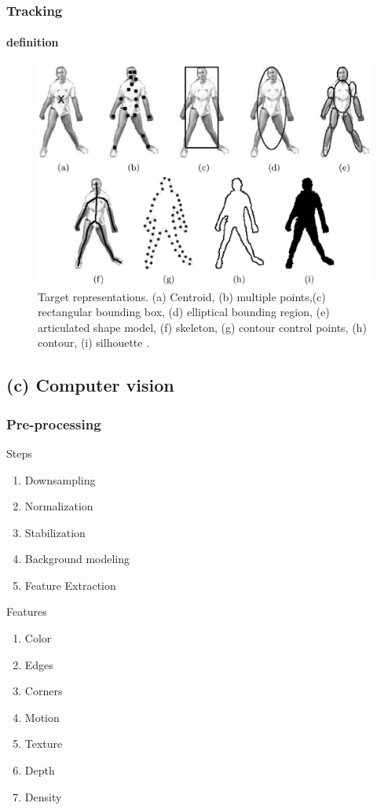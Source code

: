 \begin{frame}
\frametitle{Tracking}
\framesubtitle{definition}
\logoCSIPCPL\mypagenum
\begin{figure}[t]
\center
\includegraphics[width=1.0\textwidth]{thesis/2006_JNL_TRKsurvey_Shah_fig1.png}
\caption{Target representations.  (a) Centroid, (b) multiple points,(c) rectangular bounding box, (d) elliptical bounding region, (e) articulated shape model, (f) skeleton, (g) contour control points, (h) contour, (i) silhouette \cite{2006_JNL_SURVEYtrk_Yilmaz}.}
\label{fig:TRK_objectRepresentations}
\end{figure}
\end{frame}


\subsection{(c) Computer vision}
\begin{frame}
\frametitle{Pre-processing}
\logoCSIPCPL\mypagenum
	{\color{red}Steps}
	\begin{enumerate}
		\item Downsampling
		\item Normalization
		\item Stabilization
		\item Background modeling
		\item Feature Extraction
	\end{enumerate}
	\vspace{0.3in}
	{\color{red}Features}
	\begin{enumerate}
		\item Color
		\item Edges
		\item Corners
		\item Motion
		\item Texture
		\item Depth
		\item Density
	\end{enumerate}
\end{frame}









